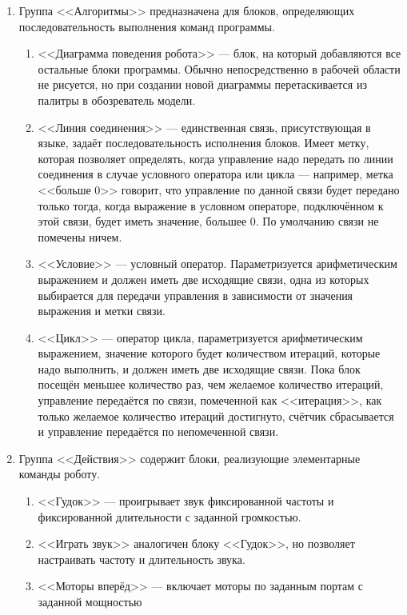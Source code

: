 \begin{enumerate}
	\item Группа <<Алгоритмы>> предназначена для блоков, определяющих последовательность 
		выполнения команд программы.
		\begin{enumerate}
			\item <<Диаграмма поведения робота>> --- блок, на который добавляются все остальные 
				блоки программы. Обычно непосредственно в рабочей области не рисуется, но 
				при создании новой диаграммы перетаскивается из палитры в обозреватель модели.
			\item <<Линия соединения>> --- единственная связь, присутствующая в языке, задаёт 
				последовательность исполнения блоков. Имеет метку, которая позволяет определять, 
				когда управление надо передать по линии соединения в случае условного оператора 
				или цикла --- например, метка <<больше 0>> говорит, что управление по данной 
				связи будет передано только тогда, когда выражение в условном операторе, подключённом 
				к этой связи, будет иметь значение, большее 0. По умолчанию связи не помечены ничем.
			\item <<Условие>> --- условный оператор. Параметризуется арифметическим выражением 
				и должен иметь две исходящие связи, одна из которых выбирается для передачи 
				управления в зависимости от значения выражения и метки связи.
			\item <<Цикл>> --- оператор цикла, параметризуется арифметическим выражением, 
				значение которого будет количеством итераций, которые надо выполнить, и должен 
				иметь две исходящие связи. Пока блок посещён меньшее количество раз, чем желаемое 
				количество итераций, управление передаётся по связи, помеченной как <<итерация>>, 
				как только желаемое количество итераций достигнуто, счётчик сбрасывается и 
				управление передаётся по непомеченной связи.
		\end{enumerate}
	\item Группа <<Действия>> содержит блоки, реализующие элементарные команды роботу.
		\begin{enumerate}
			\item <<Гудок>> --- проигрывает звук фиксированной частоты и фиксированной длительности 
				с заданной громкостью.
			\item <<Играть звук>> аналогичен блоку <<Гудок>>, но позволяет настраивать частоту 
				и длительность звука.
			\item <<Моторы вперёд>> --- включает моторы по заданным портам с заданной мощностью 

\end{enumerate}
\end{enumerate}
